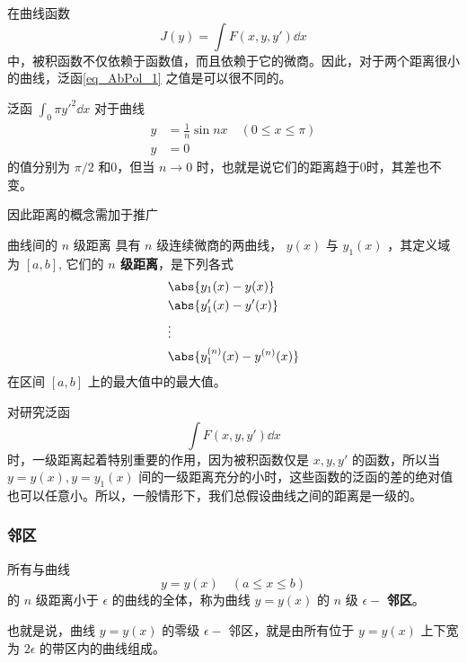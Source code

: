 在曲线函数
\begin{equation}\label{eq_AbPol_1}
J(y)=\int F(x,y,y')\dd x
\end{equation}
中，被积函数不仅依赖于函数值，而且依赖于它的微商。因此，对于两个距离很小的曲线，泛函\autoref{eq_AbPol_1} 之值是可以很不同的。
\begin{example}{}
泛函 $\int_0\pi y'^2\dd x$ 对于曲线
\begin{equation}
\begin{aligned}
y&=\frac{1}{n}\sin nx\quad (0\leq x\leq \pi)\\
y&=0
\end{aligned}
\end{equation}
的值分别为 $\pi/2$ 和0，但当 $n\rightarrow 0$ 时，也就是说它们的距离趋于0时，其差也不变。
\end{example}

因此距离的概念需加于推广
\begin{definition}{曲线间的 $n$ 级距离}\label{def_AbPol_1}
具有 $n$ 级连续微商的两曲线， $y(x)$ 与 $y_1(x)$ ，其定义域为 $[a,b]$, 它们的 \textbf{$n$ 级距离}，是下列各式
\begin{equation}
\begin{aligned}
&\abs{y_1(x)-y(x)}\\
&\abs{y_1'(x)-y'(x)}\\
&\vdots\\
&\abs{y_1^{(n)}(x)-y^{(n)}(x)}\\
\end{aligned}
\end{equation}
在区间 $[a,b]$ 上的最大值中的最大值。
\end{definition}

对研究泛函
\begin{equation}
\int F(x,y,y')\dd x
\end{equation}
时，一级距离起着特别重要的作用，因为被积函数仅是 $x,y,y'$ 的函数，所以当 $y=y(x),y=y_1(x)$ 间的一级距离充分的小时，这些函数的泛函的差的绝对值也可以任意小。所以，一般情形下，我们总假设曲线之间的距离是一级的。
\subsubsection{邻区}
所有与曲线
\begin{equation}
y=y(x)\quad (a\leq x\leq b)
\end{equation}
 的 $n$ 级距离小于 $\epsilon$ 的曲线的全体，称为曲线 $y=y(x)$ 的 $n$ 级 $\epsilon -$ \textbf{邻区}。 
 
 也就是说，曲线 $y=y(x)$ 的零级 $\epsilon-$ 邻区，就是由所有位于 $y=y(x)$ 上下宽为 $2\epsilon$ 的带区内的曲线组成。

